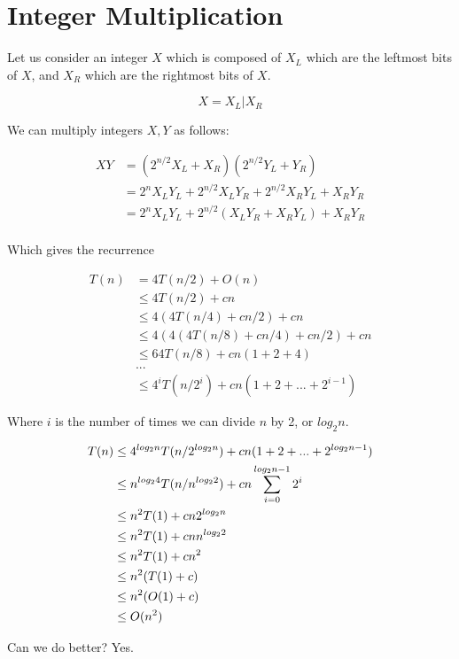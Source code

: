 \chapter{Integer Multiplication}

Let us consider an integer $X$ which is composed of $X_L$ which are
the leftmost bits of $X$, and $X_R$ which are the rightmost bits of
$X$.

\begin{displaymath}
X = X_L | X_R
\end{displaymath}

We can multiply integers $X,Y$ as follows:

\begin{align*}
XY
&= (2^{n/2}X_L + X_R)(2^{n/2}Y_L + Y_R) \\
&= 2^n X_LY_L + 2^{n/2}X_LY_R + 2^{n/2}X_RY_L + X_RY_R \\
&= 2^n X_LY_L + 2^{n/2}(X_LY_R + X_RY_L) + X_RY_R \\
\end{align*}

Which gives the recurrence

\begin{align*}
T(n)
&= 4T(n/2) + O(n) \\
&\leq 4T(n/2) + cn \\
&\leq 4(4T(n/4) + cn/2) + cn \\
&\leq 4(4(4T(n/8) + cn/4) + cn/2) + cn \\
&\leq 64T(n/8) + cn(1 + 2 + 4) \\
&... \\
&\leq 4^iT(n/2^i) + cn(1 + 2 + ... + 2^{i-1})
\end{align*}

Where $i$ is the number of times we can divide $n$ by 2, or $log_2n$.

\begin{align*}
T(n)
&\leq 4^{log_2n}T(n/2^{log_2n}) + cn(1 + 2 + ... + 2^{log_2n-1}) \\
&\leq n^{log_24}T(n/n^{log_22}) + cn \displaystyle\sum\limits_{i=0}^{log_2n-1} 2^i \\
&\leq n^2T(1) + cn 2^{log_2n} \\
&\leq n^2T(1) + cn n^{log_22} \\
&\leq n^2T(1) + cn^2 \\
&\leq n^2(T(1) + c) \\
&\leq n^2(O(1) + c) \\
&\leq O(n^2)
\end{align*}

Can we do better?  Yes.

